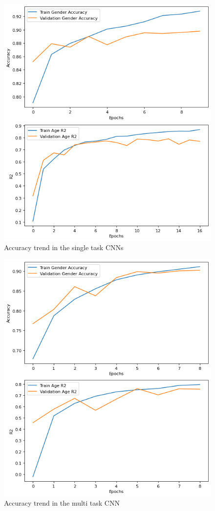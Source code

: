 \begin{figure}[htbp]
    \centerline{\includegraphics[width=.45\textwidth]{images/training/acc-single.png}}
    \caption{Accuracy trend in the single task CNNs}
    \label{4acc}
\end{figure}
\begin{figure}[htbp]
    \centerline{\includegraphics[width=.45\textwidth]{images/training/acc-multi.png}}
    \caption{Accuracy trend in the multi task CNN}
    \label{5acc}
\end{figure}

